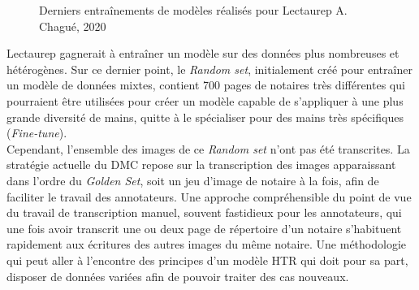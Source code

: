 \begin{figure}[H]
    \centering
    \centerline{}
    \caption{Derniers entraînements de modèles réalisés pour Lectaurep   \textcopyright A. Chagué, 2020}
    \label{fig:visual_newmodels}
\end{figure}

Lectaurep gagnerait à entraîner un modèle sur des données plus nombreuses et hétérogènes. Sur ce dernier point, le \textit{Random set}, initialement créé pour entraîner un modèle de données mixtes, contient 700 pages de notaires très différentes qui pourraient être utilisées pour créer un modèle capable de s'appliquer à une plus grande diversité de mains, quitte à le spécialiser pour des mains très spécifiques (\textit{Fine-tune}).\\

Cependant, l'ensemble des images de ce \textit{Random set} n'ont pas été transcrites. La stratégie actuelle du DMC repose sur la transcription des images apparaissant dans l'ordre du \textit{Golden Set}, soit un jeu d'image de notaire à la fois, afin de faciliter le travail des annotateurs. Une approche compréhensible du point de vue du travail de transcription manuel, souvent fastidieux pour les annotateurs, qui une fois avoir transcrit une ou deux page de répertoire d'un notaire s'habituent rapidement aux écritures des autres images du même notaire. Une méthodologie qui peut aller à l'encontre des principes d'un modèle HTR qui doit pour sa part, disposer de données variées afin de pouvoir traiter des cas nouveaux.


